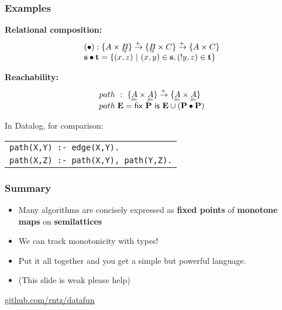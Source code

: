 \documentclass{beamer}
\newcommand{\mto}{\overset{+\:}{\to}}
\newcommand{\eq}[1]{\underaccent{\mathit{eq}}{#1}}
\newcommand{\fin}[1]{\underaccent{\mathit{fin}}{#1}}
\newcommand{\m}[1]{\ensuremath{\mathbf{#1}}}
\newcommand{\ms}{\mathsf}
\begin{document}

\begin{frame}
  \frametitle{Examples}

  \textbf{Relational composition:}\vspace{-0.8em}
  \[\begin{array}{l}
    (\bullet) : \{A \times \eq{B}\} \mto \{\eq{B} \times C\} \mto \{A \times C\}\\
    \m{s} \bullet \m{t} =
    \{(x,z) ~|~ (x,y) \in \m{s}, (!y,z) \in \m{t}\}
  \end{array}\]

  \vspace{0.2em}

  \textbf{Reachability:}\vspace{-0.8em}
  \[\begin{array}{l}
    path ~:~ \{\fin{A} \times \fin{A}\} \mto \{\fin{A} \times \fin{A}\}\\
    path\;\m{E} = \ms{fix}~\m{P}~\ms{is}~ \m{E} \cup (\m{P} \bullet \m{P})
  \end{array}\]
  \vspace{0.2em}

  In Datalog, for comparison:
  \begin{tabular}{l}
    \texttt{path(X,Y) :- edge(X,Y).}\\
    \texttt{path(X,Z) :- path(X,Y), path(Y,Z).}\\
  \end{tabular}

\end{frame}





\begin{frame}
  \frametitle{Summary}

  \begin{itemize}
  \item Many algorithms are concisely expressed as \textbf{fixed points} of
    \textbf{monotone maps} on \textbf{semilattices}
  \item We can track monotonicity with types!
  \item Put it all together and you get a simple but powerful language.
  \item \color{red} (This slide is weak please help)
  \end{itemize}

  \vspace{1em}
  \begin{center}
    {\Large \url{github.com/rntz/datafun}}
  \end{center}
\end{frame}
\end{document}
